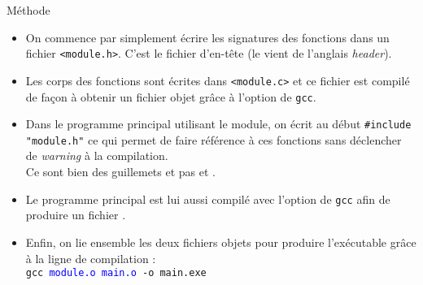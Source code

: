 \documentclass[10pt]{beamer}
\begin{document}
\begin{frame}[fragile]{\Ctitle}{\stitle}
	\begin{alertblock}{Méthode}
		\begin{itemize}
			\item<2-> On commence par simplement écrire les signatures des fonctions dans un fichier {\tt <module.h>}. C'est le fichier d'en-tête (le  vient de l'anglais \textit{header}).
			\item<3-> Les corps des fonctions sont  écrites dans {\tt <module.c>} et ce fichier est compilé de façon à obtenir un fichier objet  grâce à l'option  de {\tt gcc}.
			\item<4-> Dans le programme principal utilisant le module, on écrit au début \texttt{#include "module.h"} ce qui permet de faire référence à ces fonctions sans déclencher de \textit{warning} à la compilation. \\
				\onslide<5->\textcolor{BrickRed}{\small \danger} Ce sont bien des guillemets et pas \kw{<} et \kw{>}. \\
			\item<5-> Le programme principal est lui aussi compilé avec l'option  de {\tt gcc} afin de produire un fichier .
			\item<6-> Enfin, on lie ensemble les deux fichiers objets pour produire l'exécutable grâce à la ligne de compilation :\\
				\onslide<6-> {\tt gcc \textcolor{blue}{module.o  main.o} -o main.exe}
		\end{itemize}
	\end{alertblock}
\end{frame}
\end{document}

